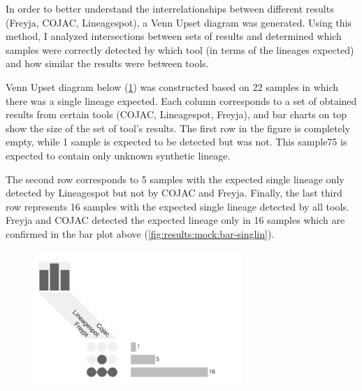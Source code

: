                 In order to better understand the interrelationships between different results (Freyja, COJAC, Lineagespot), a Venn Upset diagram was generated. Using this method, I analyzed intersections between sets of results and determined which samples were correctly detected by which tool (in terms of the lineages expected) and how similar the results were between tools.

                Venn Upset diagram below (\cref{fig:results:mock:venn-singlin}) was constructed based on 22 samples in which there was a single lineage expected. Each column corresponds to a set of obtained results from certain tools (COJAC, Lineagespot, Freyja), and bar charts on top show the size of the set of tool’s results. The first row in the figure is completely empty, while 1 sample is expected to be detected but was not. This sample75 is expected to contain only unknown synthetic lineage. 
                
                The second row corresponds to 5 samples with the expected single lineage only detected by Lineagespot but not by COJAC and Freyja. Finally, the last third row represents 16 samples with the expected single lineage detected by all tools. Freyja and COJAC detected the expected lineage only in 16 samples which are confirmed in the bar plot above (\cref{fig:results:mock:bar-singlin}).
                \begin{figure}[ht!]
                	\centering
                    \includegraphics[width=0.7\textwidth]{figures/results/mock/venn-singlin.png}
                    \label{fig:results:mock:venn-singlin}
                \end{figure}

